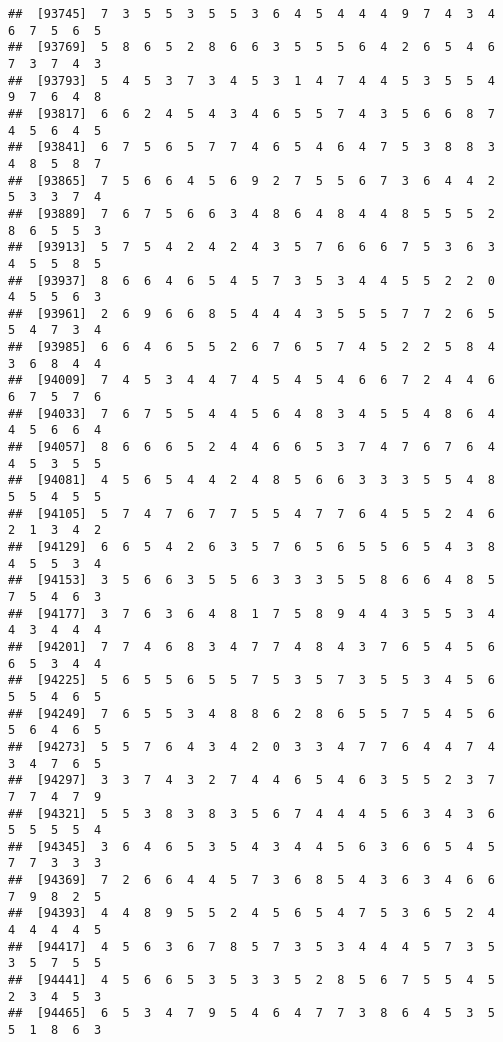\documentclass[
]{book}
\begin{document}
\begin{verbatim}
##  [93745]  7  3  5  5  3  5  5  3  6  4  5  4  4  4  9  7  4  3  4  6  7  5  6  5
##  [93769]  5  8  6  5  2  8  6  6  3  5  5  5  6  4  2  6  5  4  6  7  3  7  4  3
##  [93793]  5  4  5  3  7  3  4  5  3  1  4  7  4  4  5  3  5  5  4  9  7  6  4  8
##  [93817]  6  6  2  4  5  4  3  4  6  5  5  7  4  3  5  6  6  8  7  4  5  6  4  5
##  [93841]  6  7  5  6  5  7  7  4  6  5  4  6  4  7  5  3  8  8  3  4  8  5  8  7
##  [93865]  7  5  6  6  4  5  6  9  2  7  5  5  6  7  3  6  4  4  2  5  3  3  7  4
##  [93889]  7  6  7  5  6  6  3  4  8  6  4  8  4  4  8  5  5  5  2  8  6  5  5  3
##  [93913]  5  7  5  4  2  4  2  4  3  5  7  6  6  6  7  5  3  6  3  4  5  5  8  5
##  [93937]  8  6  6  4  6  5  4  5  7  3  5  3  4  4  5  5  2  2  0  4  5  5  6  3
##  [93961]  2  6  9  6  6  8  5  4  4  4  3  5  5  5  7  7  2  6  5  5  4  7  3  4
##  [93985]  6  6  4  6  5  5  2  6  7  6  5  7  4  5  2  2  5  8  4  3  6  8  4  4
##  [94009]  7  4  5  3  4  4  7  4  5  4  5  4  6  6  7  2  4  4  6  6  7  5  7  6
##  [94033]  7  6  7  5  5  4  4  5  6  4  8  3  4  5  5  4  8  6  4  4  5  6  6  4
##  [94057]  8  6  6  6  5  2  4  4  6  6  5  3  7  4  7  6  7  6  4  4  5  3  5  5
##  [94081]  4  5  6  5  4  4  2  4  8  5  6  6  3  3  3  5  5  4  8  5  5  4  5  5
##  [94105]  5  7  4  7  6  7  7  5  5  4  7  7  6  4  5  5  2  4  6  2  1  3  4  2
##  [94129]  6  6  5  4  2  6  3  5  7  6  5  6  5  5  6  5  4  3  8  4  5  5  3  4
##  [94153]  3  5  6  6  3  5  5  6  3  3  3  5  5  8  6  6  4  8  5  7  5  4  6  3
##  [94177]  3  7  6  3  6  4  8  1  7  5  8  9  4  4  3  5  5  3  4  4  3  4  4  4
##  [94201]  7  7  4  6  8  3  4  7  7  4  8  4  3  7  6  5  4  5  6  6  5  3  4  4
##  [94225]  5  6  5  5  6  5  5  7  5  3  5  7  3  5  5  3  4  5  6  5  5  4  6  5
##  [94249]  7  6  5  5  3  4  8  8  6  2  8  6  5  5  7  5  4  5  6  5  6  4  6  5
##  [94273]  5  5  7  6  4  3  4  2  0  3  3  4  7  7  6  4  4  7  4  3  4  7  6  5
##  [94297]  3  3  7  4  3  2  7  4  4  6  5  4  6  3  5  5  2  3  7  7  7  4  7  9
##  [94321]  5  5  3  8  3  8  3  5  6  7  4  4  4  5  6  3  4  3  6  5  5  5  5  4
##  [94345]  3  6  4  6  5  3  5  4  3  4  4  5  6  3  6  6  5  4  5  7  7  3  3  3
##  [94369]  7  2  6  6  4  4  5  7  3  6  8  5  4  3  6  3  4  6  6  7  9  8  2  5
##  [94393]  4  4  8  9  5  5  2  4  5  6  5  4  7  5  3  6  5  2  4  4  4  4  4  5
##  [94417]  4  5  6  3  6  7  8  5  7  3  5  3  4  4  4  5  7  3  5  3  5  7  5  5
##  [94441]  4  5  6  6  5  3  5  3  3  5  2  8  5  6  7  5  5  4  5  2  3  4  5  3
##  [94465]  6  5  3  4  7  9  5  4  6  4  7  7  3  8  6  4  5  3  5  5  1  8  6  3

\end{verbatim}
\end{document}

